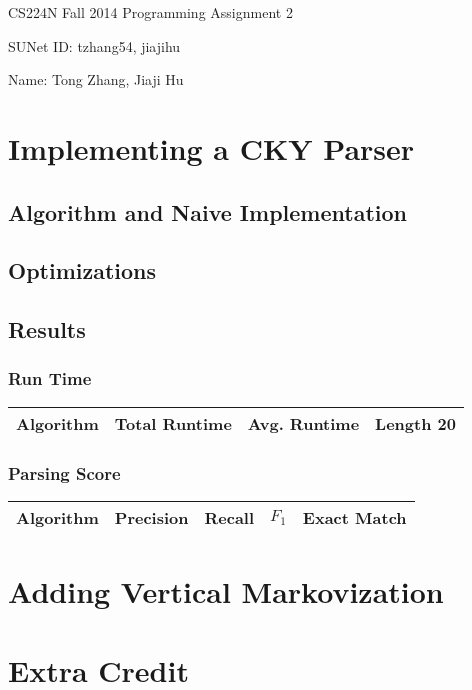 \documentclass[12pt]{article}
\begin{document}
\begin{center}
{\Large CS224N Fall 2014 Programming Assignment 2}
\vspace{12pt}

SUNet ID: tzhang54, jiajihu

Name: Tong Zhang, Jiaji Hu
\vspace{12pt}
\end{center}

\section{Implementing a CKY Parser}
\subsection{Algorithm and Naive Implementation}

\subsection{Optimizations}

\subsection{Results}
\subsubsection{Run Time}
\begin{center}
\begin{tabular}{|c|c|c|c|}
\hline
Algorithm & Total Runtime & Avg. Runtime & Length 20 \\\hline

\end{tabular}
\end{center}

\subsubsection{Parsing Score}
\begin{center}
\begin{tabular}{|c|c|c|c|c|}
\hline
Algorithm & Precision & Recall & $F_1$ & Exact Match \\\hline

\end{tabular}
\end{center}

\section{Adding Vertical Markovization}

\section{Extra Credit}
\end{document}
